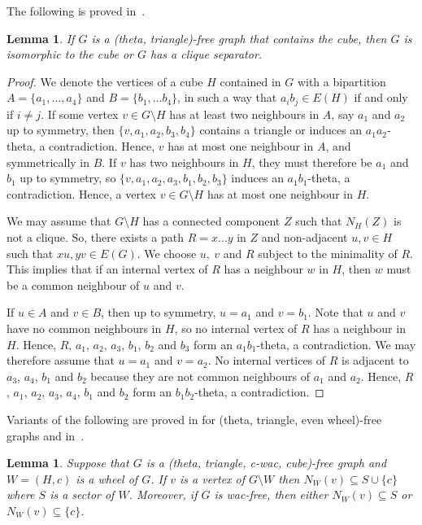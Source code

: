 \documentclass[11pt]{article}
\newtheorem{lemma}[theo]{Lemma}
\newcommand{\sm}{\setminus}
\begin{document}
The following is proved in~\cite{radovanovicV:theta}.

\begin{lemma}
  \label{l:decCube}
  If $G$ is a (theta, triangle)-free graph that contains the cube, then $G$ is isomorphic to the cube or $G$ has a clique separator.  
\end{lemma}

\begin{proof}
  We denote the vertices of a cube $H$ contained in $G$ with a bipartition $A= \{a_1, \dots, a_4\}$ and $B= \{b_1, \dots b_4\}$, in such a way that $a_i b_j\in E(H)$ if and only if $i\neq j$. If some vertex $v\in G\sm H$ has at least two neighbours in $A$, say $a_1$ and $a_2$ up to symmetry, then $\{v, a_1, a_2, b_3, b_4\}$ contains a triangle or induces an $a_1a_2$-theta, a contradiction.  Hence, $v$ has at most one neighbour in $A$, and symmetrically in $B$.  If $v$ has two neighbours in $H$, they must therefore be $a_1$ and $b_1$ up to symmetry, so $\{v, a_1, a_2, a_3, b_1, b_2, b_3\}$ induces an $a_1b_1$-theta, a contradiction.  Hence, a vertex $v\in G\sm H$ has at most one neighbour in $H$. 
  
  We may assume that $G\sm H$ has a connected component $Z$ such that $N_H(Z)$ is not a clique.  So, there exists a path $R = x\dots y$ in $Z$ and non-adjacent $u, v\in H$ such that $xu, yv\in E(G)$. We choose $u,~v$ and $R$ subject to the minimality of $R$. This implies that if an internal vertex  of $R$ has a neighbour $w$ in $H$, then $w$ must be a common neighbour of $u$ and $v$.   
  
  If $u\in A$ and $v\in B$, then up to symmetry, $u=a_1$ and $v=b_1$.  Note that  $u$ and $v$ have no common neighbours in $H$, so no internal vertex of $R$ has a neighbour in $H$.  Hence, $R$, $a_1$, $a_2$, $a_3$, $b_1$, $b_2$ and $b_3$ form an $a_1b_1$-theta, a contradiction. 
  We may therefore assume that $u=a_1$ and $v=a_2$.  No internal vertices of $R$ is adjacent to $a_3$, $a_4$,  $b_1$ and $b_2$ because they are not common neighbours of $a_1$ and $a_2$. Hence, $R$,  $a_1$, $a_2$, $a_3$, $a_4$, $b_1$ and $b_2$ form an $b_1b_2$-theta, a contradiction. 
\end{proof}


Variants of the following are proved in \cite[Theorem 2.5]{DBLP:journals/jgt/ConfortiCKV00} for (theta, triangle, even wheel)-free graphs and in~\cite[Lemma 3.1]{DBLP:journals/corr/abs-2001-01607}. 
\begin{lemma}
  \label{l:VattachW}
  Suppose that $G$ is a (theta, triangle, c-wac, cube)-free graph and $W = (H, c)$ is a wheel of $G$.  If $v$ is a vertex of $G\sm W$ then $N_W(v) \subseteq S\cup \{c\}$ where $S$ is a  sector of $W$.  Moreover, if $G$ is wac-free, then either $N_W(v) \subseteq S$ or $N_W(v) \subseteq \{c\}$.  
\end{lemma}
\end{document}
